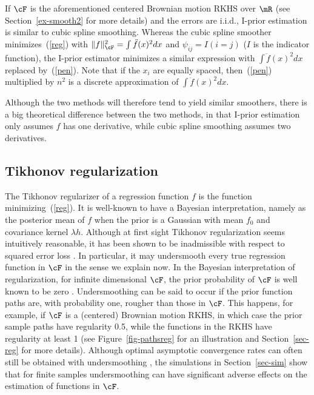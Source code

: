 \documentclass[preprint,12pt,authoryear]{elsarticle}
\DeclarePairedDelimiter{\norm}{\lVert}{\rVert}
\begin{document}
If $\cF$ is the aforementioned centered Brownian motion RKHS over $\mR$ (see Section~\ref{ex-smooth2} for more details) and the errors are i.i.d., I-prior estimation is similar to cubic spline smoothing. Whereas the cubic spline smoother minimizes~(\ref{reg}) with $\norm{f}_\cF^2=\int\ddot f(x)^2dx$ and $\psi_{ij}=I(i=j)$ ($I$ is the indicator function), the I-prior estimator minimizes a similar expression with $\int \ddot f(x)^2dx$ replaced by~(\ref{pen}).
Note that if the $x_i$ are equally spaced, then~(\ref{pen}) multiplied by $n^2$ is a discrete approximation of $\int \ddot f(x)^2dx$.

Although the two methods will therefore tend to yield similar smoothers, there is a big theoretical difference between the two methods, in that I-prior estimation only assumes $f$ has one derivative, while cubic spline smoothing assumes two derivatives. 



\subsection{Tikhonov regularization}

The Tikhonov regularizer of a regression function $f$ is the function minimizing~(\ref{reg}). It is well-known to have a Bayesian interpretation, namely as the posterior mean of $f$ when the prior is a Gaussian with mean $f_0$ and covariance kernel $\lambda h$. %
Although at first sight Tikhonov regularization seems intuitively reasonable, it has been shown to be inadmissible with respect to squared error loss \citep{cp19}. In particular, it may undersmooth every true regression function in $\cF$ in the sense we explain now. In the Bayesian interpretation of regularization, for infinite dimensional $\cF$, the prior probability of $\cF$ is well known to be zero \citep[e.g.][Section~4.1]{lifshits12}. Undersmoothing can be said to occur if the prior function paths are, with probability one, rougher than those in $\cF$. This happens, for example, if $\cF$ is a (centered) Brownian motion RKHS, in which case the prior sample paths have regularity 0.5, while the functions in the RKHS have regularity at least 1 (see Figure~\ref{fig-pathsreg} for an illustration and Section~\ref{sec-reg} for more details). Although optimal asymptotic convergence rates can often still be obtained with undersmoothing \citep{vz07}, the simulations in Section~\ref{sec-sim} show that for finite samples undersmoothing can have significant adverse effects on the estimation of functions in $\cF$. 
\end{document}

